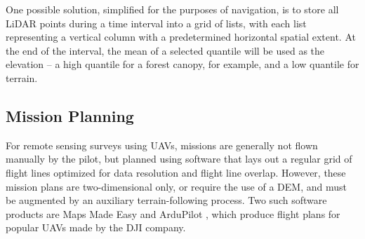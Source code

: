 \documentclass[10pt]{article}
\begin{document}
One possible solution, simplified for the purposes of navigation, is to store all LiDAR points during a time interval into a grid of lists, with each list representing a vertical column with a predetermined horizontal spatial extent. At the end of the interval, the mean of a selected quantile will be used as the elevation -- a high quantile for a forest canopy, for example, and a low quantile for terrain.


\subsection{Mission Planning}

For remote sensing surveys using UAVs, missions are generally not flown manually by the pilot, but planned using software that lays out a regular grid of flight lines optimized for data resolution and flight line overlap. However, these mission plans are two-dimensional only, or require the use of a DEM, and must be augmented by an auxiliary terrain-following process. Two such software products are Maps Made Easy \cite{Tudor2017} and ArduPilot \cite{ArduPilot2017}, which produce flight plans for popular UAVs made by the DJI company.




\end{document}
